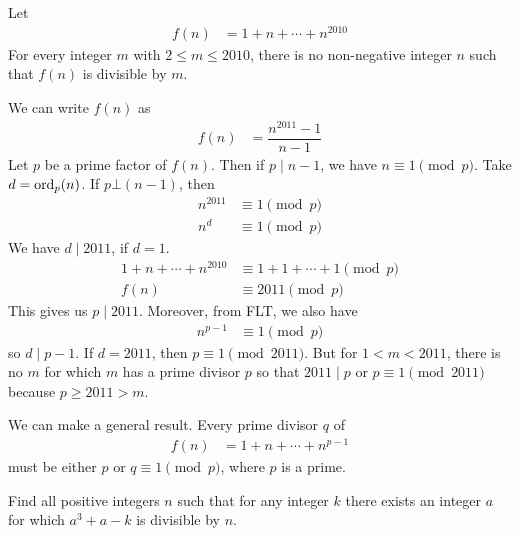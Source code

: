 \documentclass[problems.tex]{subfile}
\begin{document}
	\begin{problem}[Austria $2010$]
		Let
			\begin{align*}
				f(n) & = 1+n+\cdots+n^{2010}
			\end{align*}
		For every integer $m$ with $2\leq m\leq2010$, there is no non-negative integer $n$ such that $f(n)$ is divisible by $m$.
	\end{problem}

	\begin{solution}
		We can write $f(n)$ as
			\begin{align*}
				f(n) & = \dfrac{n^{2011}-1}{n-1}
			\end{align*}
		Let $p$ be a prime factor of $f(n)$. Then if $p\mid n-1$, we have $n\equiv1\pmod p$.  Take $d = \operatorname{ord}_p(n)$. If $p\bot (n-1)$, then
			\begin{align*}
				n^{2011}&\equiv1\pmod p\\
				n^d&\equiv1\pmod p
			\end{align*}
		We have $d\mid 2011$, if $d=1$.
			\begin{align*}
				1+n+\cdots+n^{2010} & \equiv1+1+\cdots+1\pmod p\\
				f(n) & \equiv2011\pmod p
			\end{align*}
		This gives us $p\mid 2011$. Moreover, from FLT, we also have
			\begin{align*}
				n^{p-1}&\equiv1\pmod p
			\end{align*}
		so $d\mid p-1$. If $d=2011$, then $p\equiv1\pmod{2011}$. But for $1<m<2011$, there is no $m$ for which $m$ has a prime divisor $p$ so that $2011\mid p$ or $p\equiv1\pmod{2011}$ because $p\geq2011>m$.
	\end{solution}

	\begin{remark}
		We can make a general result. Every prime divisor $q$ of
			\begin{align*}
				f(n) & = 1+n+\cdots+n^{p-1}
			\end{align*}
		must be either $p$ or $q\equiv1\pmod p$, where $p$ is a prime.
	\end{remark}

	\begin{problem}
		Find all positive integers $n$ such that for any integer $k$ there exists an integer $a$ for which $a^3 + a-k$ is divisible by $n$.
	\end{problem}
\end{document}
